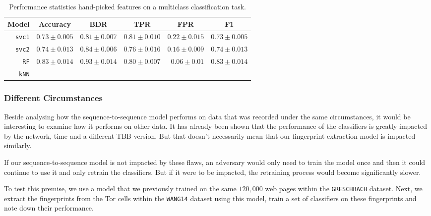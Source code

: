 \begin{table}[ht]
  \centering
  \begin{tabular}{ r  r  r  r  r  r } \hline
    \multicolumn{1}{c}{\textbf{Model}} & \multicolumn{1}{c}{\textbf{Accuracy}} & \multicolumn{1}{c}{\textbf{BDR}} & \multicolumn{1}{c}{\textbf{TPR}} &
      \multicolumn{1}{c}{\textbf{FPR}} & \multicolumn{1}{c}{\textbf{F1}} \\ \hline

    \texttt{svc1} & $0.73 \pm 0.005$ & $0.81 \pm 0.007$ & $0.81 \pm 0.010$ & $0.22 \pm 0.015$ & $0.73 \pm 0.005$ \\

    \texttt{svc2} & $0.74 \pm 0.013$ & $0.84 \pm 0.006$ & $0.76 \pm 0.016$ & $0.16 \pm 0.009$ & $0.74 \pm 0.013$ \\

    \texttt{RF} & $0.83 \pm 0.014$ & $0.93 \pm 0.014$ & $0.80 \pm 0.007$ & $0.06 \pm 0.01$ & $0.83 \pm 0.014$\\

    \texttt{kNN} & & & & & \\

    \hline
  \end{tabular}
  \caption{Performance statistics hand-picked features on a multiclass classification task.}
\end{table}

\subsubsection{Different Circumstances}

Beside analysing how the sequence-to-sequence model performs on data that was recorded under the same circumstances, it would be interesting to examine how it performs on other data.
It has already been shown that the performance of the classifiers is greatly impacted by the network, time and a different TBB version.
But that doesn't necessarily mean that our fingerprint extraction model is impacted similarly.

If our sequence-to-sequence model is not impacted by these flaws, an adversary would only need to train the model once and then it could continue to use it and only retrain the classifiers.
But if it were to be impacted, the retraining process would become significantly slower.

To test this premise, we use a model that we previously trained on the same $120,000$ web pages within the \texttt{GRESCHBACH} dataset.
Next, we extract the fingerprints from the Tor cells within the \texttt{WANG14} dataset using this model, train a set of classifiers on these fingerprints and note down their performance.

